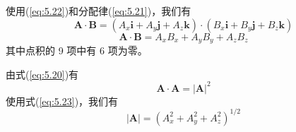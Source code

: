     使用(\ref{eq:5.22})和分配律(\ref{eq:5.21})，我们有
    \begin{equation*}
        \mathbf{A}\cdot\mathbf{B} = \left(A_x\mathbf{i} + A_y\mathbf{j} + A_z\mathbf{k}\right)\cdot\left(B_x\mathbf{i} + B_y\mathbf{j} + B_z\mathbf{k}\right)
    \end{equation*}
    \begin{equation}
        \boxed{
            \mathbf{A}\cdot\mathbf{B} = A_xB_x + A_yB_y + A_zB_z
        }
        \label{eq:5.23}
    \end{equation}
    其中点积的 9 项中有 6 项为零。

    由式(\ref{eq:5.20})有
    \begin{equation}
        \boxed{
            \mathbf{A}\cdot\mathbf{A} = \left|\mathbf{A}\right|^2
        }
        \label{eq:5.24}
    \end{equation}
    使用式(\ref{eq:5.23})，我们有
    \begin{equation}
        \boxed{
            \left|\mathbf{A}\right| = \left(A_x^2 + A_y^2 + A_z^2\right)^{1/2}
        }
        \label{eq:5.25}
    \end{equation}

